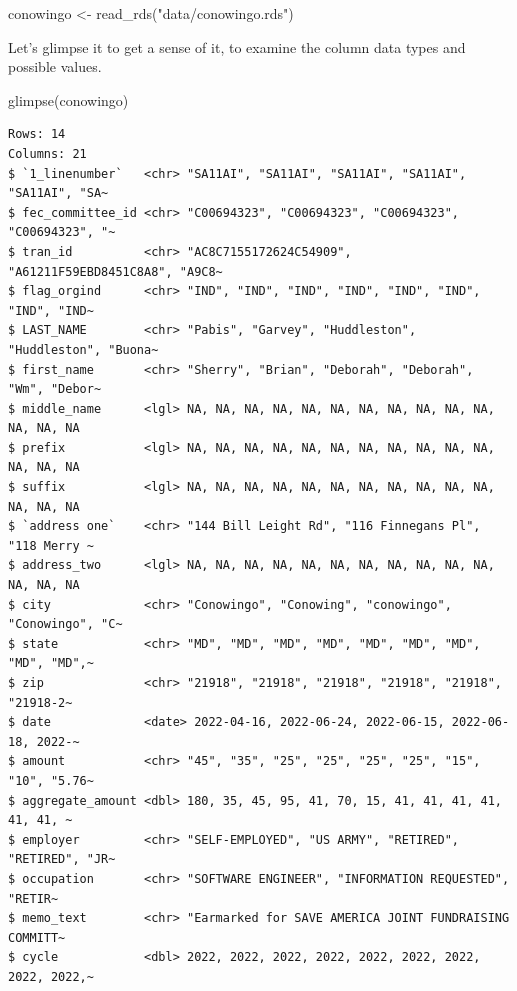 \documentclass[
  letterpaper,
  DIV=11,
  numbers=noendperiod]{scrreprt}
\newenvironment{Shaded}{\begin{snugshade}}{\end{snugshade}}
\newcommand{\FunctionTok}[1]{\textcolor[rgb]{0.28,0.35,0.67}{#1}}
\newcommand{\NormalTok}[1]{\textcolor[rgb]{0.00,0.23,0.31}{#1}}
\newcommand{\OtherTok}[1]{\textcolor[rgb]{0.00,0.23,0.31}{#1}}
\newcommand{\StringTok}[1]{\textcolor[rgb]{0.13,0.47,0.30}{#1}}
\begin{document}
\begin{Shaded}
\begin{Highlighting}[]
\NormalTok{conowingo }\OtherTok{\textless{}{-}} \FunctionTok{read\_rds}\NormalTok{(}\StringTok{"data/conowingo.rds"}\NormalTok{)}
\end{Highlighting}
\end{Shaded}

Let's glimpse it to get a sense of it, to examine the column data types
and possible values.

\begin{Shaded}
\begin{Highlighting}[]
\FunctionTok{glimpse}\NormalTok{(conowingo)}
\end{Highlighting}
\end{Shaded}

\begin{verbatim}
Rows: 14
Columns: 21
$ `1_linenumber`   <chr> "SA11AI", "SA11AI", "SA11AI", "SA11AI", "SA11AI", "SA~
$ fec_committee_id <chr> "C00694323", "C00694323", "C00694323", "C00694323", "~
$ tran_id          <chr> "AC8C7155172624C54909", "A61211F59EBD8451C8A8", "A9C8~
$ flag_orgind      <chr> "IND", "IND", "IND", "IND", "IND", "IND", "IND", "IND~
$ LAST_NAME        <chr> "Pabis", "Garvey", "Huddleston", "Huddleston", "Buona~
$ first_name       <chr> "Sherry", "Brian", "Deborah", "Deborah", "Wm", "Debor~
$ middle_name      <lgl> NA, NA, NA, NA, NA, NA, NA, NA, NA, NA, NA, NA, NA, NA
$ prefix           <lgl> NA, NA, NA, NA, NA, NA, NA, NA, NA, NA, NA, NA, NA, NA
$ suffix           <lgl> NA, NA, NA, NA, NA, NA, NA, NA, NA, NA, NA, NA, NA, NA
$ `address one`    <chr> "144 Bill Leight Rd", "116 Finnegans Pl", "118 Merry ~
$ address_two      <lgl> NA, NA, NA, NA, NA, NA, NA, NA, NA, NA, NA, NA, NA, NA
$ city             <chr> "Conowingo", "Conowing", "conowingo", "Conowingo", "C~
$ state            <chr> "MD", "MD", "MD", "MD", "MD", "MD", "MD", "MD", "MD",~
$ zip              <chr> "21918", "21918", "21918", "21918", "21918", "21918-2~
$ date             <date> 2022-04-16, 2022-06-24, 2022-06-15, 2022-06-18, 2022-~
$ amount           <chr> "45", "35", "25", "25", "25", "25", "15", "10", "5.76~
$ aggregate_amount <dbl> 180, 35, 45, 95, 41, 70, 15, 41, 41, 41, 41, 41, 41, ~
$ employer         <chr> "SELF-EMPLOYED", "US ARMY", "RETIRED", "RETIRED", "JR~
$ occupation       <chr> "SOFTWARE ENGINEER", "INFORMATION REQUESTED", "RETIR~
$ memo_text        <chr> "Earmarked for SAVE AMERICA JOINT FUNDRAISING COMMITT~
$ cycle            <dbl> 2022, 2022, 2022, 2022, 2022, 2022, 2022, 2022, 2022,~
\end{verbatim}
\end{document}
